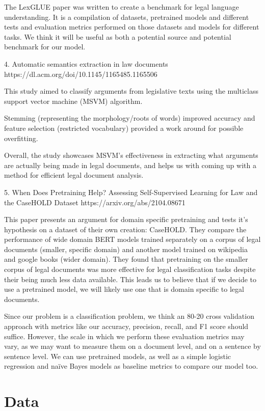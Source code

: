 \documentclass[11pt,a4paper]{article}
\begin{document}
The LexGLUE paper was written to create a benchmark for legal language understanding. It is a compilation of datasets, pretrained models and different tests and evaluation metrics performed on those datasets and models for different tasks. We think it will be useful as both a potential source and potential benchmark for our model.

4. Automatic semantics extraction in law documents
https://dl.acm.org/doi/10.1145/1165485.1165506 

This study aimed to classify arguments from legislative texts using the multiclass support vector machine (MSVM) algorithm.

Stemming (representing the morphology/roots of words) improved accuracy and feature selection (restricted vocabulary) provided a work around for possible overfitting.

Overall, the study showcases MSVM's effectiveness in extracting what arguments are actually being made in legal documents,
and helps us with coming up with a method for efficient legal document analysis.

5. When Does Pretraining Help? Assessing Self-Supervised Learning for Law and the CaseHOLD Dataset
https://arxiv.org/abs/2104.08671

This paper presents an argument for domain specific pretraining and tests it's hypothesis on a dataset of their own creation: CaseHOLD. They compare the performance of wide domain BERT models trained separately on a corpus of legal documents (smaller, specific domain) and another model trained on wikipedia and google books (wider domain). They found that pretraining on the smaller corpus of legal documents was more effective for legal classification tasks despite their being much less data available. This leads us to believe that if we decide to use a pretrained model, we will likely use one that is domain specific to legal documents. 

Since our problem is a classification problem, we think an 80-20 cross validation approach with metrics like our accuracy, precision, recall, and F1 score should suffice. However, the scale in which we perform these evaluation metrics may vary, as we may want to measure them on a document level, and on a sentence by sentence level. We can use pretrained models, as well as a simple logistic regression and naïve Bayes models as baseline metrics to compare our model too. 

\section{Data}
\end{document}
